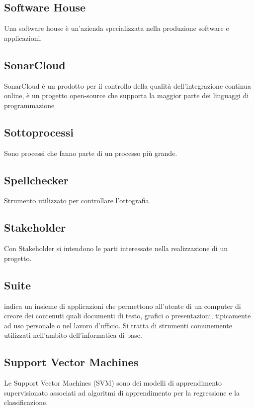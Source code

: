 \subsection*{Software House}
Una software house è un'azienda specializzata nella produzione software e applicazioni.

\subsection*{SonarCloud}
SonarCloud è un prodotto per il controllo della qualità dell'integrazione continua online, è un progetto open-source che supporta la maggior parte dei linguaggi di programmazione

\subsection*{Sottoprocessi}
Sono processi che fanno parte di un processo più grande.

\subsection*{Spellchecker}
Strumento utilizzato per controllare l'ortografia.

\subsection*{Stakeholder}
Con Stakeholder si intendono le parti interessate nella realizzazione di un progetto.

\subsection*{Suite}
indica un insieme di applicazioni che permettono all'utente di un computer di creare dei contenuti quali documenti di testo, grafici o presentazioni, tipicamente ad uso personale o nel lavoro d'ufficio.
Si tratta di strumenti comunemente utilizzati nell'ambito dell'informatica di base.

\subsection*{Support Vector Machines}
Le Support Vector Machines (SVM) sono dei modelli di apprendimento supervisionato associati ad algoritmi di apprendimento per la regressione e la classificazione.

